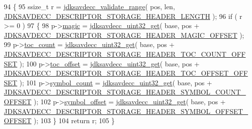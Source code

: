 \begin{DoxyCode}
94 \{
95     ssize\_t r = \hyperlink{group__util_ga9c02bdfe76c69163647c3196db7a73a1}{jdksavdecc\_validate\_range}( pos, len, 
      \hyperlink{group__descriptor__storage__header_ga40ba715ff2f7643324bcd41822d75325}{JDKSAVDECC\_DESCRIPTOR\_STORAGE\_HEADER\_LENGTH} );
96     \textcolor{keywordflow}{if} ( r >= 0 )
97     \{
98         p->\hyperlink{structjdksavdecc__descriptor__storage__header_a57f54349f4fd1cbbb52058812e146af2}{magic} = \hyperlink{group__endian_gaefcf5bd4f368997a82f358ab89052d6b}{jdksavdecc\_uint32\_get}( base, pos + 
      \hyperlink{group__descriptor__storage__header_ga99b64877253801c44997944b1c951f29}{JDKSAVDECC\_DESCRIPTOR\_STORAGE\_HEADER\_MAGIC\_OFFSET} );
99         p->\hyperlink{structjdksavdecc__descriptor__storage__header_a22c14d132b1eabf9f84417876ad8022b}{toc\_count} = \hyperlink{group__endian_gaefcf5bd4f368997a82f358ab89052d6b}{jdksavdecc\_uint32\_get}( base, pos + 
      \hyperlink{group__descriptor__storage__header_gaffb871a86e925cd3423153984e3fe2b8}{JDKSAVDECC\_DESCRIPTOR\_STORAGE\_HEADER\_TOC\_COUNT\_OFFSET} 
      );
100         p->\hyperlink{structjdksavdecc__descriptor__storage__header_a633a6afa4bfb208d943ddadb31e983ad}{toc\_offset} = \hyperlink{group__endian_gaefcf5bd4f368997a82f358ab89052d6b}{jdksavdecc\_uint32\_get}( base, pos + 
      \hyperlink{group__descriptor__storage__header_gaf5771f5dc02e8b63d9152c2421859775}{JDKSAVDECC\_DESCRIPTOR\_STORAGE\_HEADER\_TOC\_OFFSET\_OFFSET}
       );
101         p->\hyperlink{structjdksavdecc__descriptor__storage__header_a6af37e9b121cd752f19687265d421a1f}{symbol\_count} = \hyperlink{group__endian_gaefcf5bd4f368997a82f358ab89052d6b}{jdksavdecc\_uint32\_get}( base, pos + 
      \hyperlink{group__descriptor__storage__header_ga8f599a40045785cffa37c361f8653e54}{JDKSAVDECC\_DESCRIPTOR\_STORAGE\_HEADER\_SYMBOL\_COUNT\_OFFSET}
       );
102         p->\hyperlink{structjdksavdecc__descriptor__storage__header_a8c57a9eff61cd27a604d84ff1c777e61}{symbol\_offset} = \hyperlink{group__endian_gaefcf5bd4f368997a82f358ab89052d6b}{jdksavdecc\_uint32\_get}( base, pos + 
      \hyperlink{group__descriptor__storage__header_gabc3e6fbd3eea04b517b3bca6256ff67f}{JDKSAVDECC\_DESCRIPTOR\_STORAGE\_HEADER\_SYMBOL\_OFFSET\_OFFSET}
       );
103     \}
104     \textcolor{keywordflow}{return} r;
105 \}
\end{DoxyCode}


